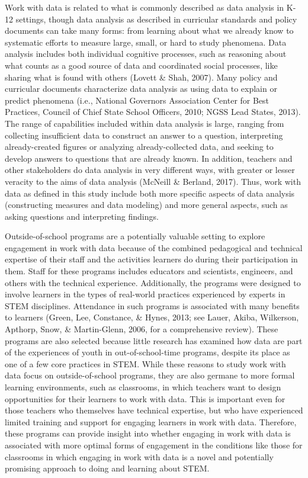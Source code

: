 \documentclass[]{book}
\theoremstyle{definition}
\theoremstyle{definition}
\theoremstyle{definition}
\theoremstyle{remark}
\begin{document}
Work with data is related to what is commonly described as data analysis
in K-12 settings, though data analysis as described in curricular
standards and policy documents can take many forms: from learning about
what we already know to systematic efforts to measure large, small, or
hard to study phenomena. Data analysis includes both individual
cognitive processes, such as reasoning about what counts as a good
source of data and coordinated social processes, like sharing what is
found with others (Lovett \& Shah, 2007). Many policy and curricular
documents characterize data analysis as using data to explain or predict
phenomena (i.e., National Governors Association Center for Best
Practices, Council of Chief State School Officers, 2010; NGSS Lead
States, 2013). The range of capabilities included within data analysis
is large, ranging from collecting insufficient data to construct an
answer to a question, interpreting already-created figures or analyzing
already-collected data, and seeking to develop answers to questions that
are already known. In addition, teachers and other stakeholders do data
analysis in very different ways, with greater or lesser veracity to the
aims of data analysis (McNeill \& Berland, 2017). Thus, work with data
as defined in this study include both more specific aspects of data
analysis (constructing measures and data modeling) and more general
aspects, such as asking questions and interpreting findings.

Outside-of-school programs are a potentially valuable setting to explore
engagement in work with data because of the combined pedagogical and
technical expertise of their staff and the activities learners do during
their participation in them. Staff for these programs includes educators
and scientists, engineers, and others with the technical experience.
Additionally, the programs were designed to involve learners in the
types of real-world practices experienced by experts in STEM
disciplines. Attendance in such programs is associated with many
benefits to learners (Green, Lee, Constance, \& Hynes, 2013; see Lauer,
Akiba, Wilkerson, Apthorp, Snow, \& Martin-Glenn, 2006, for a
comprehensive review). These programs are also selected because little
research has examined how data are part of the experiences of youth in
out-of-school-time programs, despite its place as one of a few core
practices in STEM. While these reasons to study work with data focus on
outside-of-school programs, they are also germane to more formal
learning environments, such as classrooms, in which teachers want to
design opportunities for their learners to work with data. This is
important even for those teachers who themselves have technical
expertise, but who have experienced limited training and support for
engaging learners in work with data. Therefore, these programs can
provide insight into whether engaging in work with data is associated
with more optimal forms of engagement in the conditions like those for
classrooms in which engaging in work with data is a novel and
potentially promising approach to doing and learning about STEM.
\end{document}
